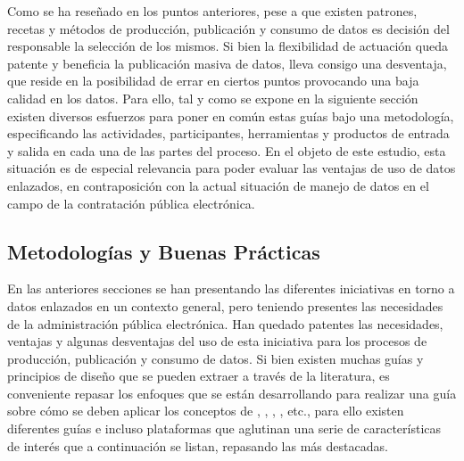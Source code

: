 Como se ha reseñado en los puntos anteriores, pese a que existen patrones, recetas y métodos de producción, publicación y consumo de datos
es decisión del responsable la selección de los mismos. Si bien la flexibilidad de actuación queda patente y beneficia
la publicación masiva de datos, lleva consigo una desventaja, que reside en la posibilidad de errar en ciertos puntos provocando
una baja calidad en los datos. Para ello, tal y como se expone en la siguiente sección existen diversos esfuerzos para poner en común
estas guías bajo una metodología, especificando las actividades, participantes, herramientas y productos de entrada y salida
en cada una de las partes del proceso. En el objeto de este estudio, esta situación es de especial relevancia para poder evaluar las ventajas
de uso de datos enlazados, en contraposición con la actual situación de manejo de datos en el campo de la contratación pública
electrónica.

\subsection{Metodologías y Buenas Prácticas}\label{metodologias}
En las anteriores secciones se han presentando las diferentes iniciativas en torno a datos enlazados en un contexto
general, pero teniendo presentes las necesidades de la administración pública electrónica. Han quedado patentes las necesidades,
ventajas y algunas desventajas del uso de esta iniciativa para los procesos de producción, publicación y consumo de datos. Si 
bien existen muchas guías y principios de diseño que se pueden extraer a través de la literatura, es conveniente repasar
los enfoques que se están desarrollando para realizar una guía sobre cómo se deben aplicar los conceptos de  \linkeddata, \opendata, \ogd, \lod, etc., 
para ello existen diferentes guías e incluso plataformas que aglutinan una serie de características de interés que a continuación se listan, 
repasando las más destacadas.


